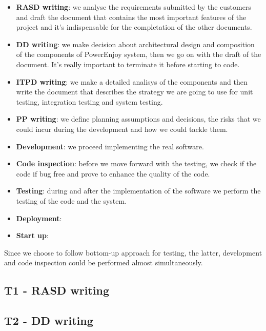 \documentclass[english]{article}
\begin{document}
\begin{itemize}
	\item{\textbf{RASD writing}: we analyse the requirements submitted by the customers and draft the document that contains the most important features of the project and it's indispensable for the completation of the other documents.}
	
	\item{\textbf{DD writing}: we make decision about architectural design and composition of the components of PowerEnjoy system, then we go on with the draft of the document. It's really important to terminate it before starting to code.}

	\item{\textbf{ITPD writing}: we make a detailed analisys of the components and then write the document that describes the strategy we are going to use for unit testing, integration testing and system testing.}

	\item{\textbf{PP writing}: we define planning assumptions and decisions, the risks that we could incur during the development and how we could tackle them.}

	\item{\textbf{Development}: we proceed implementing the real software.}

	\item{\textbf{Code inspection}: before we move forward with the testing, we check if the code if bug free and prove to enhance the quality of the code.}

	\item{\textbf{Testing}: during and after the implementation of the software we perform the testing of the code and the system.}

	\item{\textbf{Deployment}: }

	\item{\textbf{Start up}: }
\end{itemize}

Since we choose to follow bottom-up approach for testing, the latter, development and code inspection could be performed almost simultaneously.

\subsection{T1 - RASD writing}


\subsection{T2 - DD writing}
\end{document}
